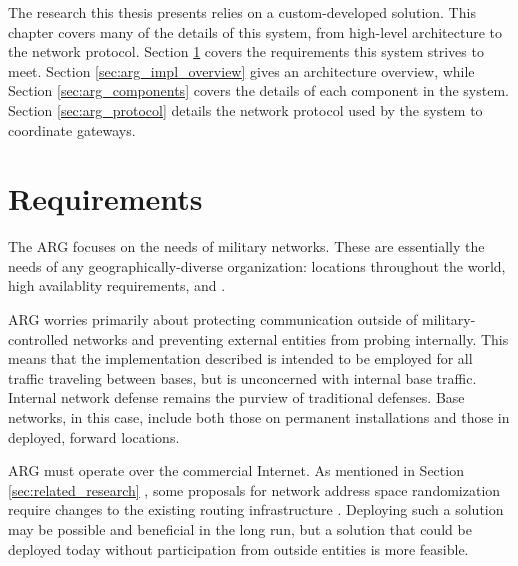 \label{chp:implementation}
\par The research this thesis presents relies on a custom-developed solution. This chapter covers many of the details of this system, from high-level architecture to the network protocol. Section \ref{sec:arg_requirements} covers the requirements this system strives to meet. Section \ref{sec:arg_impl_overview} gives an architecture overview, while Section \ref{sec:arg_components} covers the details of each component in the system. Section \ref{sec:arg_protocol} details the network protocol used by the system to coordinate gateways.

\section{Requirements}
\label{sec:arg_requirements}
\par The \ac{ARG} focuses on the needs of military networks. These are essentially the needs of any geographically-diverse organization: locations throughout the world, high availablity requirements, and . 

\par ARG worries primarily about protecting communication outside of military-controlled networks and preventing external entities from probing internally. This means that the implementation described is intended to be employed for all traffic traveling between bases, but is unconcerned with internal base traffic. Internal network defense remains the purview of traditional defenses. Base networks, in this case, include both those on permanent installations and those in deployed, forward locations. 

\par ARG must operate over the commercial Internet. As mentioned in Section \ref{sec:related_research} , some proposals for network address space randomization require changes to the existing routing infrastructure \cite{CONTRA}. Deploying such a solution may be possible and beneficial in the long run, but a solution that could be deployed today without participation from outside entities is more feasible.


